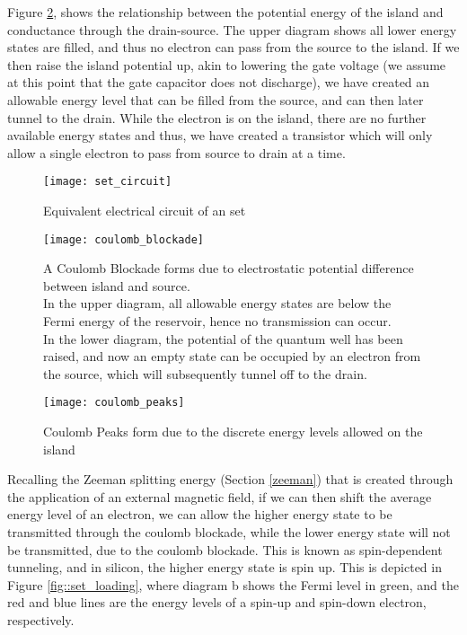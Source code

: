 Figure \ref{fig::coulomb_blockade}, shows the relationship between the potential energy of the island and conductance through the drain-source. The upper diagram shows all lower energy states are filled, and thus no electron can pass from the source to the island. If we then raise the island potential up, akin to lowering the gate voltage (we assume at this point that the gate capacitor does not discharge), we have created an allowable energy level that can be filled from the source, and can then later tunnel to the drain. While the electron is on the island, there are no further available energy states and thus, we have created a transistor which will only allow a single electron to pass from source to drain at a time.

\begin{figure}[htbp!]
	\centering
	\texttt{[image: set\_circuit]}
	\caption{Equivalent electrical circuit of an \gls{set}\cite{devoret2000amplifying}}
	\label{fig::set_circuit}
\end{figure}

\begin{figure}[htbp!]
	\centering
	\texttt{[image: coulomb\_blockade]}
	\caption{A Coulomb Blockade \cite{coulomb_blockade} forms due to electrostatic potential difference between island and source.\\ In the upper diagram, all allowable energy states are below the Fermi energy of the reservoir, hence no transmission can occur.\\ In the lower diagram, the potential of the quantum well has been raised, and now an empty state can be occupied by an electron from the source, which will subsequently tunnel off to the drain.}
	\label{fig::coulomb_blockade}
\end{figure}

\begin{figure}[htbp!]
	\centering
	\texttt{[image: coulomb\_peaks]}
	\caption{Coulomb Peaks form due to the discrete energy levels allowed on the island\cite{elec9705_lecture}}
	\label{fig::coulomb_peaks}
\end{figure}



Recalling the Zeeman splitting energy (Section \ref{zeeman}) that is created through the application of an external magnetic field, if we can then shift the average energy level of an electron, we can allow the higher energy state to be transmitted through the coulomb blockade, while the lower energy state will not be transmitted, due to the coulomb blockade. This is known as spin-dependent tunneling, and in silicon, the higher energy state is spin up. This is depicted in Figure \ref{fig::set_loading}, where diagram b shows the Fermi level in green, and the red and blue lines are the energy levels of a spin-up and spin-down electron, respectively. 

